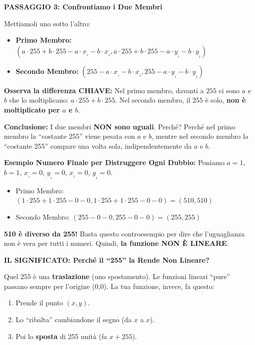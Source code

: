 \documentclass[
]{article}
\providecommand{\tightlist}{%
  \setlength{\itemsep}{0pt}\setlength{\parskip}{0pt}}
\begin{document}
\textbf{PASSAGGIO 3: Confrontiamo i Due Membri}

Mettiamoli uno sotto l'altro:

\begin{itemize}
\tightlist
\item
  \textbf{Primo Membro:} \((a\cdot255 + b\cdot255 - a\cdot x_₁ - b\cdot x_₂, a\cdot255 + b\cdot255 - a\cdot y_₁ - b \cdot y_₂)\)
\item
  \textbf{Secondo Membro:} \((255 - a\cdot x_₁ - b\cdot x_₂, 255 - a \cdot y_₁ - b\cdot y_₂)\)
\end{itemize}

\textbf{Osserva la differenza CHIAVE:}
Nel primo membro, davanti a \(255\) ci sono \(a\) e \(b\) che lo moltiplicano: \(a\cdot255 + b\cdot255\).
Nel secondo membro, il \(255\) è solo, \textbf{non è moltiplicato per \(a\) e \(b\)}.

\textbf{Conclusione:} I due membri \textbf{NON sono uguali}. Perché? Perché nel primo membro la ``costante 255'' viene pesata con \(a\) e \(b\), mentre nel secondo membro la ``costante 255'' compare una volta sola, indipendentemente da \(a\) e \(b\).

\textbf{Esempio Numero Finale per Distruggere Ogni Dubbio:}
Poniamo \(a=1\), \(b=1\), \(x_₁=0\), \(y_₁=0\), \(x_₂=0\), \(y_₂=0\).

\begin{itemize}
\tightlist
\item
  Primo Membro: \((1\cdot 255 + 1\cdot 255 - 0 - 0, 1\cdot 255 + 1\cdot 255 - 0 - 0) = (510, 510)\)
\item
  Secondo Membro: \((255 - 0 - 0, 255 - 0 - 0) = (255, 255)\)
\end{itemize}

\textbf{510 è diverso da 255!} Basta questo controesempio per dire che l'uguaglianza non è vera per tutti i numeri. Quindi, \textbf{la funzione NON È LINEARE}.

\textbf{IL SIGNIFICATO: Perché il ``255'' la Rende Non Lineare?}

Quel \(255\) è una \textbf{traslazione} (uno spostamento). Le funzioni lineari ``pure'' passano sempre per l'origine (0,0). La tua funzione, invece, fa questo:

\begin{enumerate}
\def\labelenumi{\arabic{enumi}.}
\tightlist
\item
  Prende il punto \((x, y)\).
\item
  Lo ``ribalta'' cambiandone il segno (da \(x\) a \(x\)).
\item
  Poi lo \textbf{sposta} di 255 unità (fa \(x + 255\)).
\end{enumerate}
\end{document}

